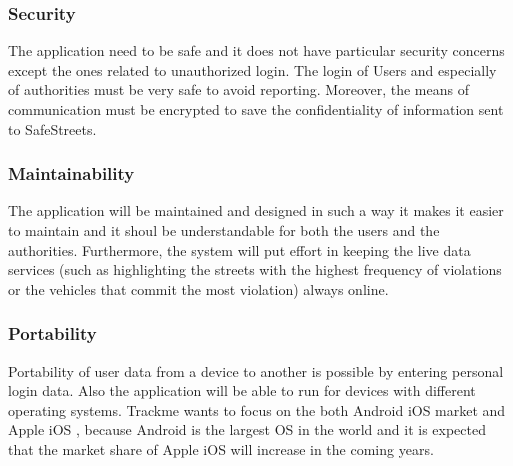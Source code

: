\subsubsection{Security}
The application need to be safe and it does not have particular security concerns except the ones related to unauthorized login. The login of Users and especially of authorities must be very safe to avoid reporting. Moreover, the means of communication must be encrypted to save the confidentiality of information sent to SafeStreets.
\subsubsection{Maintainability}
The application will be maintained and designed in such a way it makes it easier to maintain and it shoul be understandable for both the users and the authorities. Furthermore, the system will put eﬀort in keeping the live data services (such as highlighting the streets with the highest frequency of violations or the vehicles that commit the most violation) always online.
\subsubsection{Portability}
Portability of user data from a device to another is possible by entering personal login data. Also the application will be able to run for devices with different operating systems. Trackme wants to focus on the both Android iOS market and Apple iOS , because Android is the largest OS in the world and it is expected that the market share of Apple iOS will increase in the coming years.

